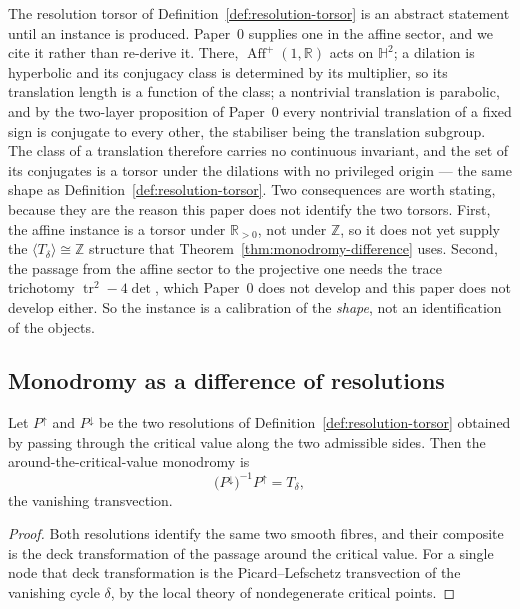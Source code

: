 \begin{remark}
\label{rem:affine-instance-of-the-torsor}
The resolution torsor of Definition~\ref{def:resolution-torsor} is an abstract
statement until an instance is produced.  Paper~0 supplies one in the affine sector,
and we cite it rather than re-derive it.  There,
\(\operatorname{Aff}^{+}(1,\mathbb R)\) acts on \(\mathbb H^2\); a dilation is
hyperbolic and its conjugacy class is determined by its multiplier, so its
translation length is a function of the class; a nontrivial translation is
parabolic, and by the two-layer proposition of Paper~0
\cite{Yuan2026AEGPaperZero} every nontrivial translation of a fixed sign is
conjugate to every other, the stabiliser being the translation subgroup.  The class of a translation therefore carries no
continuous invariant, and the set of its conjugates is a torsor under the dilations
with no privileged origin --- the same shape as
Definition~\ref{def:resolution-torsor}.  Two consequences are worth stating,
because they are the reason this paper does not identify the two torsors.
First, the affine instance is a torsor under \(\mathbb R_{>0}\), not under
\(\mathbb Z\), so it does not yet supply the \(\langle T_\delta\rangle\cong\mathbb Z\)
structure that Theorem~\ref{thm:monodromy-difference} uses.  Second, the passage
from the affine sector to the projective one needs the trace trichotomy
\(\operatorname{tr}^2-4\det\), which Paper~0 does not develop and this paper does
not develop either.  So the instance is a calibration of the \emph{shape}, not an
identification of the objects.
\end{remark}

\subsection{Monodromy as a difference of resolutions}

\begin{theorem}\label{thm:monodromy-difference}
Let $P^{\uparrow}$ and $P^{\downarrow}$ be the two resolutions of
Definition~\ref{def:resolution-torsor} obtained by passing through the critical value
along the two admissible sides.  Then the around-the-critical-value monodromy is
\[
  \bigl(P^{\downarrow}\bigr)^{-1}P^{\uparrow}=T_\delta ,
\]
the vanishing transvection.
\end{theorem}

\begin{proof}
Both resolutions identify the same two smooth fibres, and their composite is the deck
transformation of the passage around the critical value.  For a single node that deck
transformation is the Picard--Lefschetz transvection of the vanishing cycle $\delta$, by
the local theory of nondegenerate critical points.
\end{proof}

